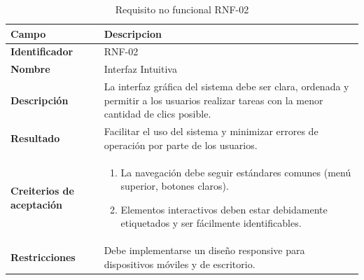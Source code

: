     \begin{table}[htb!]
        \centering
\caption{Requisito no funcional RNF-02}
        \begin{tabular}{|p{3cm}|p{12cm}|}
        \hline
        \textbf{Campo} & \textbf{Descripcion} \\ \hline
        \textbf{Identificador} & RNF-02 \\ \hline
        \textbf{Nombre} & Interfaz Intuitiva \\ \hline
        \textbf{Descripción} & La interfaz gráfica del sistema debe ser clara, ordenada y permitir a los usuarios realizar tareas con la menor cantidad de clics posible. \\ \hline
        \textbf{Resultado} & Facilitar el uso del sistema y minimizar errores de operación por parte de los usuarios. \\ \hline
        \textbf{Creiterios de aceptación} & 
        \begin{enumerate}
            \item La navegación debe seguir estándares comunes (menú superior, botones claros).
            \item Elementos interactivos deben estar debidamente etiquetados y ser fácilmente identificables.
            
        \end{enumerate}
        \\ \hline
        \textbf{Restricciones} & Debe implementarse un diseño responsive para dispositivos móviles y de escritorio. \\ \hline
        
    \end{tabular}
    \end{table}
    \FloatBarrier


